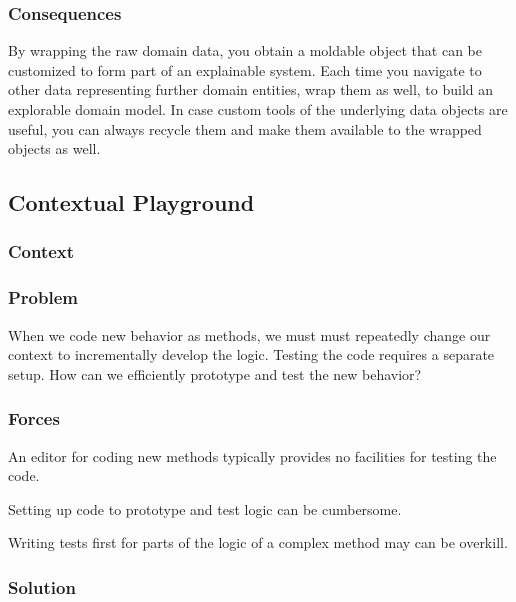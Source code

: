 \documentclass[sigconf]{acmart}
\begin{document}
\subsubsection*{Consequences}

By wrapping the raw domain data, you obtain a moldable object that can be customized to form part of an explainable system.
Each time you navigate to other data representing further domain entities, wrap them as well, to build an explorable domain model.
In case custom tools of the underlying data objects are useful, you can always recycle them and make them available to the wrapped objects as well.

\subsection*{Contextual Playground}\label{pat:contextualPlayground}
\subsubsection*{Context}
\subsubsection*{Problem}

\here

When we code new behavior as methods, we must must repeatedly change our context to incrementally develop the logic. Testing the code requires a separate setup. How can we efficiently prototype and test the new behavior?

\subsubsection*{Forces}

An editor for coding new methods typically provides no facilities for testing the code.

Setting up code to prototype and test logic can be cumbersome.

Writing tests first for parts of the logic of a complex method may can be overkill.

\subsubsection*{Solution}
\end{document}
